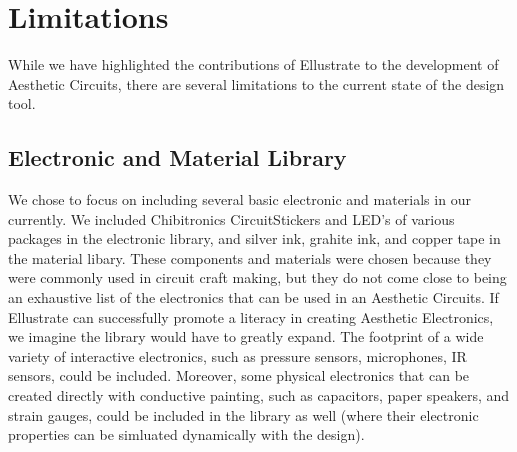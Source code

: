 \documentclass{sigchi}
\begin{document}
    

\section{Limitations}
While we have highlighted the contributions of Ellustrate to the development of Aesthetic Circuits, there are several limitations to the current state of the design tool. 

\subsection{Electronic and Material Library}
We chose to focus on including several basic electronic and materials in our currently. We included Chibitronics CircuitStickers and LED's of various packages in the electronic library, and silver ink, grahite ink, and copper tape in the material libary. These components and materials were chosen because they were commonly used in circuit craft making, but they do not come close to being an exhaustive list of the electronics that can be used in an Aesthetic Circuits. If Ellustrate can successfully promote a literacy in creating Aesthetic Electronics, we imagine the library would have to greatly expand. The footprint of a wide variety of interactive electronics, such as pressure sensors, microphones, IR sensors, could be included. Moreover, some physical electronics that can be created directly with conductive painting, such as capacitors, paper speakers, and strain gauges, could be included in the library as well (where their electronic properties can be simluated dynamically with the design). 
\end{document}
